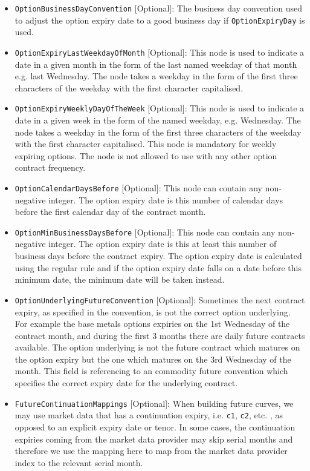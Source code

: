 \begin{itemize}
\item \lstinline!OptionBusinessDayConvention! [Optional]: The business day convention used to adjust the option expiry date to a good business day if \lstinline!OptionExpiryDay! is used.
\item \lstinline!OptionExpiryLastWeekdayOfMonth! [Optional]: This node is used to indicate a date in a given month in the form of the last named weekday of that month e.g. last Wednesday. The node takes a weekday in the form of the first three characters of the weekday with the first character capitalised.
\item \lstinline!OptionExpiryWeeklyDayOfTheWeek! [Optional]: This node is used to indicate a date in a given week in the form of the named weekday, e.g. Wednesday. The node takes a weekday in the form of the first three characters of the weekday with the first character capitalised. This node is mandatory for weekly expiring options. The node is not allowed to use with any other option contract frequency.
\item \lstinline!OptionCalendarDaysBefore! [Optional]: This node can contain any non-negative integer. The option expiry date is this number of calendar days before the first calendar day of the contract month.
\item \lstinline!OptionMinBusinessDaysBefore! [Optional]: This node can contain any non-negative integer. The option expiry date is this at least this number of business days before the contract expiry. The option expiry date is calculated using the regular rule and if the option expiry date falls on a date before this minimum date, the minimum date will be taken instead.
\item \lstinline!OptionUnderlyingFutureConvention! [Optional]: Sometimes the next contract expiry, as specified in the convention, is not the correct option underlying. For example the base metals options expiries on the 1st Wednesday of the contract month, and during the first 3 months there are daily future contracts available. The option underlying is not the future contract which matures on the option expiry but the one which matures on the 3rd Wednesday of the month. This field is referencing to an commodity future convention which specifies the correct expiry date for the underlying contract.
\item \lstinline!FutureContinuationMappings! [Optional]: When building future curves, we may use market data that has a continuation expiry, i.e. \lstinline!c1!, \lstinline!c2!, etc. , as opposed to an explicit expiry date or tenor. In some cases, the continuation expiries coming from the market data provider may skip serial months and therefore we use the mapping here to map from the market data provider index to the relevant serial month.

\end{itemize}
